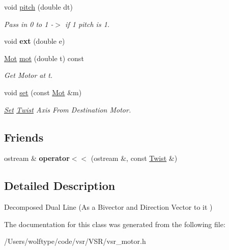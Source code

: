 \begin{DoxyCompactItemize}
\item 
\hypertarget{classvsr_1_1_twist_a476d31b557010424546971888c1e5468}{void \hyperlink{classvsr_1_1_twist_a476d31b557010424546971888c1e5468}{pitch} (double dt)}\label{classvsr_1_1_twist_a476d31b557010424546971888c1e5468}

\begin{DoxyCompactList}\small\item\em Pass in 0 to 1 -\/$>$ if 1 pitch is 1. \end{DoxyCompactList}\item 
\hypertarget{classvsr_1_1_twist_a6b382ea2557eb3e688b2a2382232f632}{void {\bfseries ext} (double e)}\label{classvsr_1_1_twist_a6b382ea2557eb3e688b2a2382232f632}

\item 
\hypertarget{classvsr_1_1_twist_a83c45e97a62ef0833c0272bc5a4a36a4}{\hyperlink{namespacevsr_ad4b77d620ed90deefbeab9d4a122667e}{Mot} \hyperlink{classvsr_1_1_twist_a83c45e97a62ef0833c0272bc5a4a36a4}{mot} (double t) const }\label{classvsr_1_1_twist_a83c45e97a62ef0833c0272bc5a4a36a4}

\begin{DoxyCompactList}\small\item\em Get Motor at t. \end{DoxyCompactList}\item 
\hypertarget{classvsr_1_1_twist_a184bb2211aaa8a15f81bce966f946edb}{void \hyperlink{classvsr_1_1_twist_a184bb2211aaa8a15f81bce966f946edb}{set} (const \hyperlink{namespacevsr_ad4b77d620ed90deefbeab9d4a122667e}{Mot} \&m)}\label{classvsr_1_1_twist_a184bb2211aaa8a15f81bce966f946edb}

\begin{DoxyCompactList}\small\item\em \hyperlink{classvsr_1_1_set}{Set} \hyperlink{classvsr_1_1_twist}{Twist} Axis From Destination Motor. \end{DoxyCompactList}\end{DoxyCompactItemize}
\subsection*{Friends}
\begin{DoxyCompactItemize}
\item 
\hypertarget{classvsr_1_1_twist_ac8d0a1ca0784e1d896d3cfcb2aa9350c}{ostream \& {\bfseries operator$<$$<$} (ostream \&, const \hyperlink{classvsr_1_1_twist}{Twist} \&)}\label{classvsr_1_1_twist_ac8d0a1ca0784e1d896d3cfcb2aa9350c}

\end{DoxyCompactItemize}


\subsection{Detailed Description}
Decomposed Dual Line (As a Bivector and Direction Vector to it ) 

The documentation for this class was generated from the following file\-:\begin{DoxyCompactItemize}
\item 
/\-Users/wolftype/code/vsr/\-V\-S\-R/vsr\-\_\-motor.\-h\end{DoxyCompactItemize}
